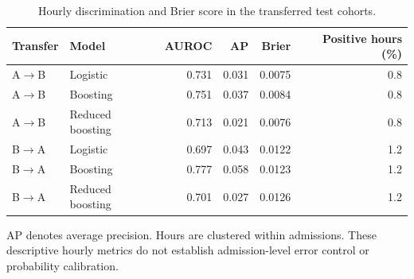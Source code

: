 \begin{table}[htbp]\centering\small
\caption{Hourly discrimination and Brier score in the transferred test cohorts.}\label{tab:disc}
\begin{tabular}{llrrrr}\toprule
Transfer & Model & AUROC & AP & Brier & Positive hours (\%) \\\midrule
A$\to$B & Logistic & 0.731 & 0.031 & 0.0075 & 0.8 \\
A$\to$B & Boosting & 0.751 & 0.037 & 0.0084 & 0.8 \\
A$\to$B & Reduced boosting & 0.713 & 0.021 & 0.0076 & 0.8 \\
B$\to$A & Logistic & 0.697 & 0.043 & 0.0122 & 1.2 \\
B$\to$A & Boosting & 0.777 & 0.058 & 0.0123 & 1.2 \\
B$\to$A & Reduced boosting & 0.701 & 0.027 & 0.0126 & 1.2 \\
\bottomrule\end{tabular}
\par\vspace{3pt}\begin{minipage}{.98\linewidth}\footnotesize AP denotes average precision. Hours are clustered within admissions. These descriptive hourly metrics do not establish admission-level error control or probability calibration.\end{minipage}
\end{table}
